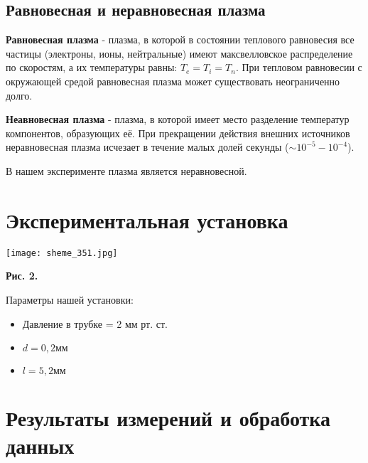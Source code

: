 \documentclass [a4paper, 12pt]{article}
\begin{document}
\subsection*{Равновесная и неравновесная плазма}

    \textbf{Равновесная плазма} - плазма, в которой в состоянии теплового равновесия все частицы (электроны, ионы, нейтральные) имеют максвелловское распределение по скоростям, а их температуры равны: $T_e = T_i = T_n$.
    При тепловом равновесии с окружающей средой равновесная плазма может существовать неограниченно долго.

    \textbf{Неавновесная плазма} - плазма, в которой имеет место разделение температур компонентов, образующих её. При прекращении действия внешних источников неравновесная плазма исчезает в течение малых долей секунды ($\sim 10^{-5} - 10^{-4}$).


    В нашем эксперименте плазма является неравновесной.






\section{Экспериментальная установка}


\begin{center}
\texttt{[image: sheme\_351.jpg]}
\end{center}
\begin{flushright}
{\small \textbf{Рис. 2.} }
\end{flushright}

    Параметры нашей установки:

\begin{itemize}
    \item Давление в трубке = 2 мм рт. ст.
    \item $d = 0,2 мм$
    \item $l = 5,2 мм$
\end{itemize}




    
\section{Результаты измерений и обработка данных}

\end{document}
